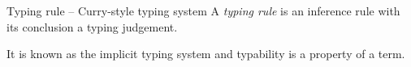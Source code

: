 \begin{frame}{Typing rule -- Curry-style typing system}
  A \emph{typing rule} is an inference rule with its conclusion a
  typing judgement.
  
  \begin{prooftree}
  \end{prooftree}
  \begin{prooftree}
  \end{prooftree}
  \begin{prooftree}
  \end{prooftree}

It is known as the implicit typing system and typability is a property of a term.
\end{frame}

%
%

